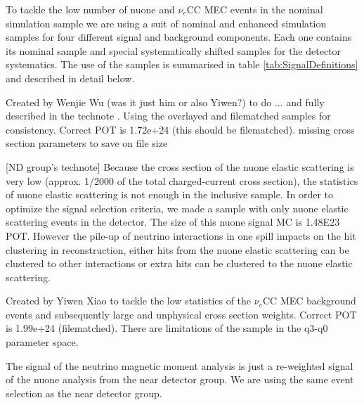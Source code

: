 To tackle the low number of \gls{nuone} and $\nu_e$\gls{CC} \gls{MEC} events in the nominal simulation sample we are using a suit of nominal and enhanced simulation samples for four different signal and background components. Each one contains its nominal sample and special systematically shifted samples for the detector systematics. The use of the samples is summarised in table \ref{tab:SignalDefinitions} and described in detail below.

Created by Wenjie Wu (was it just him or also Yiwen?) to do ... and fully described in the technote \cite{NOVA-doc-56383}. Using the overlayed and filematched samples for consistency. Correct POT is 1.72e+24 (this should be filematched). missing cross section parameters to save on file size

[ND group's technote] Because the cross section of the nuone elastic scattering is very low (approx. 1/2000 of the total charged-current cross section), the statistics of nuone elastic scattering is not enough in the inclusive sample. In order to optimize the signal selection criteria, we made a sample with only nuone elastic scattering events in the detector. The size of this nuone signal MC is 1.48E23 POT. However the pile-up of neutrino interactions in one spill impacts on the hit clustering in reconstruction, either hits from the nuone elastic scattering can be clustered to other interactions or extra hits can be clustered to the nuone elastic scattering.

Created by Yiwen Xiao \cite{NOVA-doc-56383} to tackle the low statistics of the $\nu_e$CC MEC background events and subsequently large and unphysical cross section weights. Correct POT is 1.99e+24 (filematched). There are limitations of the sample in the q3-q0 parameter space.




The signal of the neutrino magnetic moment analysis is just a re-weighted signal of the \gls{nuone} analysis from the near detector group. We are using the same event selection as the near detector group.

